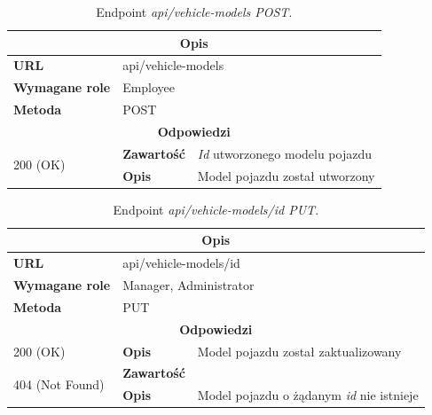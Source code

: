 \documentclass[eng,printmode,openany]{mgr}
\begin{document}
\begin{table}[H]
	\caption{Endpoint \textit{api/vehicle-models POST}.}
	\begin{tabularx}{\textwidth}{|l|l|X|}
		\hline
		\multicolumn{3}{|c|}{\textbf{\textbf{Opis}}}
		\\ \hline
		\textbf{URL}                       & \multicolumn{2}{l|}{api/vehicle-models}
		\\ \hline
		\textbf{Wymagane role}             & \multicolumn{2}{l|}{Employee}
		\\ \hline
		\textbf{Metoda}                    & \multicolumn{2}{l|}{POST}
		\\ \hline
		\multicolumn{3}{|c|}{\textbf{Odpowiedzi}}
		\\ \hline
		\multirow{2}{*}{200 (OK)} 		& \textbf{Zawartość}     & \textit{Id} utworzonego modelu pojazdu
		\\ \cline{2-3}                  & \textbf{Opis}         	& Model pojazdu został utworzony
		\\ \hline
	\end{tabularx}
\end{table}

\begin{table}[H]
	\caption{Endpoint \textit{api/vehicle-models/id PUT}.}
	\begin{tabularx}{\textwidth}{|l|l|X|}
		\hline
		\multicolumn{3}{|c|}{\textbf{\textbf{Opis}}}
		\\ \hline
		\textbf{URL}                       & \multicolumn{2}{l|}{api/vehicle-models/id}
		\\ \hline
		\textbf{Wymagane role}             & \multicolumn{2}{l|}{Manager, Administrator}
		\\ \hline
		\textbf{Metoda}                    & \multicolumn{2}{l|}{PUT}
		\\ \hline
		\multicolumn{3}{|c|}{\textbf{Odpowiedzi}}
		\\ \hline
		200 (OK) 		 & \textbf{Opis}      	& Model pojazdu został zaktualizowany
		\\ \hline
		\multirow{2}{*}{404 (Not Found)} 	    & \textbf{Zawartość}     &   
		\\ \cline{2-3}                          & \textbf{Opis}          & Model pojazdu o żądanym \textit{id} nie istnieje
		\\ \hline
	\end{tabularx}
\end{table}
\end{document}
